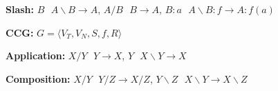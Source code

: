 \textbf{Slash:} $B \text{ } A\backslash B \rightarrow A$, $A/B \text{ } B \rightarrow A$, $B:a \text{ } A\backslash B:f \rightarrow A:f(a)$\\ 
\begin{comment}
	A CCG has two main parts: a lexicon that associates words with categories (set of word-category pairs) and rules that specify how categories can be combined into other categories.\\
	The information about the structure is encoded in categories, unlike in CFG, where structure is encoded in the rules.\\
	Basic categories are f.e. S, N, NP, PP, and the entries in the lexicon are something like (man, N).\\
\end{comment} 

\textbf{CCG:} $G = \langle V_T, V_N, S, f, R \rangle$\\
\begin{comment}
	Terminals (lexicon), Non-terminals (atomic categories), Start category, mapping from $V_T \rightarrow V_N$, and combinatory rules	.
	A category of an incomplete constitution is a function that defines it's argument and result, and indicates with the slash where the argument applies.
	A complete category is an atomic category, an incomplete category is a function that does the above.\\
	Every category X can be written as $A |_m X_m ...|_1 X_1$, where A is the target and $|_m X_m$ are arguments of X. m is the arity of X.\\
	Unlike CFG, CCG uses a universal set of rules, but encodes all language-specific information into the lexicon.\\
\end{comment} 

\textbf{Application:} $X/Y \text{ } Y \rightarrow X$, $Y \text{ } X \backslash Y \rightarrow X$\\
\begin{comment}
	A language with only the application rule could produce a context free AB-Grammar.\\
\end{comment} 

\textbf{Composition:} $X / Y \text{ } Y / Z \rightarrow X / Z$, $Y \backslash Z \text{ } X \backslash Y \rightarrow X \backslash Z$\\
\\

\begin{comment}
	CCG captures syntactic (Rules) and semantic (lambda calculus) jointly. 
	We can easily translate the rules to logical forms, that can grasp the semantics of the sentence, whereas the syntax is encoded in the structure.\\
\end{comment} 


